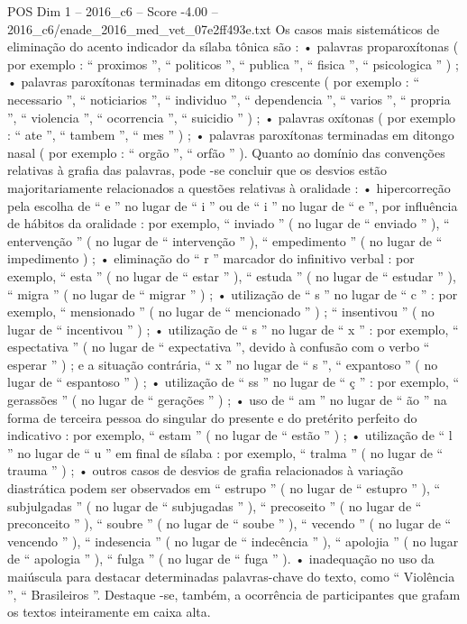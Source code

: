 \begin{textsample}{POS Dim 1 – 2016\_c6 – Score -4.00 – 2016\_c6/enade\_2016\_med\_vet\_07e2ff493e.txt}
Os casos mais sistemáticos de eliminação do acento indicador da sílaba tônica são : • palavras proparoxítonas ( por exemplo : “ proximos ”, “ politicos ”, “ publica ”, “ fisica ”, “ psicologica ” ) ; • palavras paroxítonas terminadas em ditongo crescente ( por exemplo : “ necessario ”, “ noticiarios ”, “ individuo ”, “ dependencia ”, “ varios ”, “ propria ”, “ violencia ”, “ ocorrencia ”, “ suicidio ” ) ; • palavras oxítonas ( por exemplo : “ ate ”, “ tambem ”, “ mes ” ) ; • palavras paroxítonas terminadas em ditongo nasal ( por exemplo : “ orgão ”, “ orfão ” ).
Quanto ao domínio das convenções relativas à grafia das palavras, pode -se concluir que os desvios estão majoritariamente relacionados a questões relativas à oralidade : • hipercorreção pela escolha de “ e ” no lugar de “ i ” ou de “ i ” no lugar de “ e ”, por influência de hábitos da oralidade : por exemplo, “ inviado ” ( no lugar de “ enviado ” ), “ entervenção ” ( no lugar de “ intervenção ” ), “ empedimento ” ( no lugar de “ impedimento ) ; • eliminação do “ r ” marcador do infinitivo verbal : por exemplo, “ esta ” ( no lugar de “ estar ” ), “ estuda ” ( no lugar de “ estudar ” ), “ migra ” ( no lugar de “ migrar ” ) ; • utilização de “ s ” no lugar de “ c ” : por exemplo, “ mensionado ” ( no lugar de “ mencionado ” ) ; “ insentivou ” ( no lugar de “ incentivou ” ) ; • utilização de “ s ” no lugar de “ x ” : por exemplo, “ espectativa ” ( no lugar de “ expectativa ”, devido à confusão com o verbo “ esperar ” ) ; e a situação contrária, “ x ” no lugar de “ s ”, “ expantoso ” ( no lugar de “ espantoso ” ) ; • utilização de “ ss ” no lugar de “ ç ” : por exemplo, “ gerassões ” ( no lugar de “ gerações ” ) ; • uso de “ am ” no lugar de “ ão ” na forma de terceira pessoa do singular do presente e do pretérito perfeito do indicativo : por exemplo, “ estam ” ( no lugar de “ estão ” ) ; • utilização de “ l ” no lugar de “ u ” em final de sílaba : por exemplo, “ tralma ” ( no lugar de “ trauma ” ) ; • outros casos de desvios de grafia relacionados à variação diastrática podem ser observados em “ estrupo ” ( no lugar de “ estupro ” ), “ subjulgadas ” ( no lugar de “ subjugadas ” ), “ precoseito ” ( no lugar de “ preconceito ” ), “ soubre ” ( no lugar de “ soube ” ), “ vecendo ” ( no lugar de “ vencendo ” ), “ indesencia ” ( no lugar de “ indecência ” ), “ apolojia ” ( no lugar de “ apologia ” ), “ fulga ” ( no lugar de “ fuga ” ). • inadequação no uso da maiúscula para destacar determinadas palavras-chave do texto, como “ Violência ”, “ Brasileiros ”.
Destaque -se, também, a ocorrência de participantes que grafam os textos inteiramente em caixa alta.

\end{textsample}
